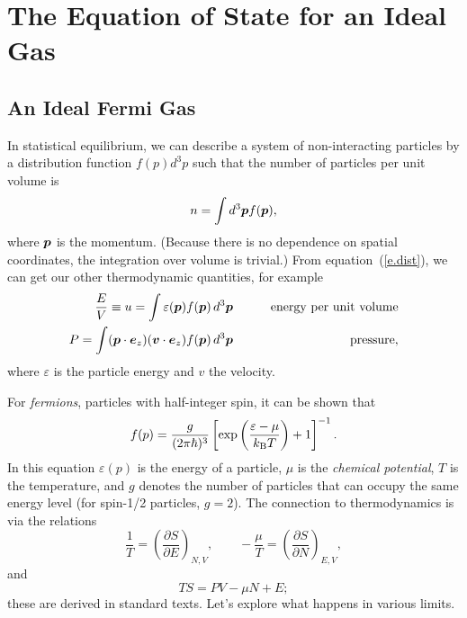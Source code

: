 \chapter[Equation of State]{The Equation of State for an Ideal Gas}
\newcommand{\vp}{\ensuremath{\bvec{p}}}
\renewcommand{\pF}{\ensuremath{p_{\mathrm{F}}}}
\newcommand{\eF}{\ensuremath{\varepsilon_{\mathrm{F}}}}

\section{An Ideal Fermi Gas}
In statistical equilibrium, we can describe a system of non-interacting particles by a distribution function $f(p)d^{3}p$ such that the number of particles per unit volume is
\begin{equation}\label{e.dist}
n = \int d^{3}\vp f(\vp),
\end{equation}
where $\vp$ is the momentum. (Because there is no dependence on spatial coordinates, the integration over volume is trivial.) From equation~(\ref{e.dist}), we can get our other thermodynamic quantities, for example
\begin{eqnarray}
\frac{E}{V} \equiv u = \int  \varepsilon(\vp) f(\vp)\,d^{3}\vp &\qquad& \textrm{energy per unit volume}\label{e.u}\\
P = \int  (\vp\cdot\bvec{e}_{z})(\bvec{v}\cdot\bvec{e}_{z}) f(\vp)\,d^{3}\vp &\qquad& \textrm{pressure},\label{e.P}
\end{eqnarray}
where $\varepsilon$ is the particle energy and $v$ the velocity.

For \emph{fermions}, particles with half-integer spin, it can be shown that
\begin{equation}\label{e.fermion}
f(p) = \frac{g}{(2\pi\hbar)^{3}} \left[\exp\left(\frac{\varepsilon-\mu}{k_\mathrm{B} T}\right)+1\right]^{-1}.
\end{equation}
In this equation $\varepsilon(p)$ is the energy of a particle, $\mu$ is the \emph{chemical potential}, $T$ is the temperature, and $g$ denotes the number of particles that can occupy the same energy level (for spin-1/2 particles, $g=2$).  The connection to thermodynamics is via the relations
\[
\frac{1}{T} = \left(\frac{\partial S}{\partial E}\right)_{N,V},\qquad -\frac{\mu}{T} = \left(\frac{\partial S}{\partial N}\right)_{E,V},
\]
and 
\[
TS = PV - \mu N + E;
\]
these are derived in standard texts. Let's explore what happens in various limits.  

